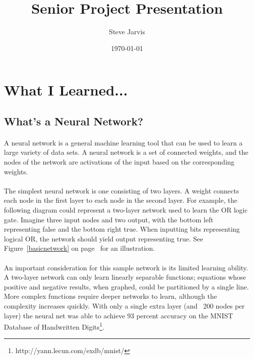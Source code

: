 \documentclass{article}
\title{Senior Project Presentation}
\author{Steve Jarvis}
\date{\today}
\begin{document}
\maketitle

\section{What I Learned...}

\subsection{What's a Neural Network?}

    \paragraph{}A neural network is a general machine learning tool that can be 
    used to learn a large variety of data sets. A neural network is a set of 
    connected weights, and the nodes of the network are activations of the input 
    based on the corresponding weights.

    \paragraph{}The simplest neural network is one consisting of two layers. A 
    weight connects each node in the first layer to each node in the second layer.
    For example, the following diagram could represent a two-layer network used to
    learn the OR logic gate. Imagine three input nodes and two output, with the 
    bottom left representing false and the bottom right true. When inputting bits 
    representing logical OR, the network should yield output representing true. 
    See Figure~\ref{basicnetwork} on  page~\pageref{basicnetwork} for an 
    illustration.

    \paragraph{}An important consideration for this sample network is its limited 
    learning ability. A two-layer network can only learn linearly separable 
    functions; equations whose positive and negative results, when graphed, could 
    be partitioned by a single line. More complex functions require deeper networks
    to learn, although the complexity increases quickly. With only a single extra 
    layer (and ~200 nodes per layer) the neural net was able to achieve 93 percent
    accuracy on the MNIST Database of Handwritten 
    Digits\footnote{http://yann.lecun.com/exdb/mnist/}.
\end{document}
